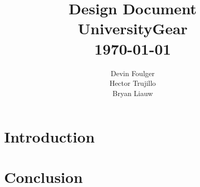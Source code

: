 \documentclass[journal,compsoc, 10pt, draftclsnofoot, onecolumn]{IEEEtran}
\begin{document}
\title{\vspace{20em}Design Document \\{\vspace{-1ex}\huge UniversityGear} \\
{\large \today}}
\author{\vspace{10ex}Devin Foulger \\{\vspace{-1ex}Hector Trujillo}
\\{\vspace{-1ex}Bryan Liauw}}

\begin{titlepage}

\maketitle
\thispagestyle{empty}

\end{titlepage}

\tableofcontents

\section{Introduction}

\section{Conclusion}
\end{document}
